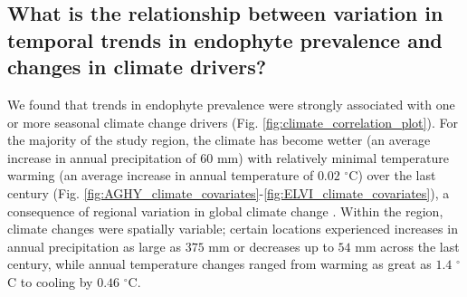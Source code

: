 \documentclass[11pt]{article}
\let\cite\citep
\begin{document}






\subsection*{What is the relationship between variation in temporal trends in endophyte prevalence and changes in climate drivers?}
We found that trends in endophyte prevalence were strongly associated with one or more seasonal climate change drivers (Fig. \ref{fig:climate_correlation_plot}).
For the majority of the study region, the climate has become wetter (an average increase in annual precipitation of $60$ mm) with relatively minimal temperature warming (an average increase in annual temperature of $0.02$ $^{\circ}$C) over the last century (Fig. \ref{fig:AGHY_climate_covariates}-\ref{fig:ELVI_climate_covariates}), a consequence of regional variation in global climate change \cite{ipcc_2021}. 
Within the region, climate changes were spatially variable; certain locations experienced increases in annual precipitation as large as $375$ mm or decreases up to $54$ mm across the last century, while annual temperature changes ranged from warming as great as $1.4$ $^{\circ}$C to cooling by $0.46$ $^{\circ}$C.
\end{document}
